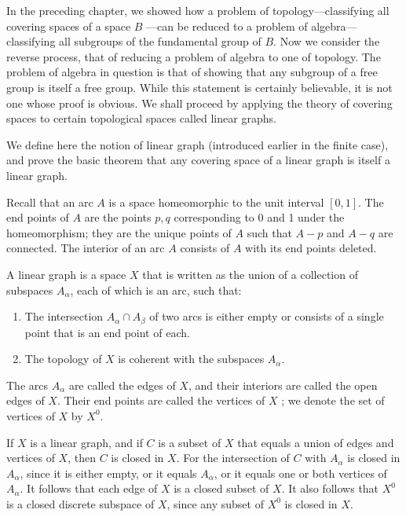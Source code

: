 
In the preceding chapter, we showed how a problem of topology---classifying all covering spaces of a space \(B\) ---can be reduced to a problem of algebra---classifying all subgroups of the fundamental group of \(B\). Now we consider the reverse process, that of reducing a problem of algebra to one of topology. The problem of algebra in question is that of showing that any subgroup of a free group is itself a free group. While this statement is certainly believable, it is not one whose proof is obvious. We shall proceed by applying the theory of covering spaces to certain topological spaces called linear graphs.


We define here the notion of linear graph (introduced earlier in the finite case), and prove the basic theorem that any covering space of a linear graph is itself a linear graph.

Recall that an arc \(A\) is a space homeomorphic to the unit interval \([ {0,1}]\). The end points of \(A\) are the points \(p,q\) corresponding to 0 and 1 under the homeomorphism; they are the unique points of \(A\) such that \(A - p\) and \(A - q\) are connected. The interior of an arc \(A\) consists of \(A\) with its end points deleted.

\begin{definition}
	A linear graph is a space \(X\) that is written as the union of a collection of subspaces \(A_{\alpha }\), each of which is an arc, such that:

	\begin{enumerate}[itemsep=0.2em, parsep=0pt, topsep=0pt, partopsep=0pt, leftmargin=*, label=(\arabic*), align=left]
	\item The intersection \(A_{\alpha } \cap {A}_{\beta }\) of two arcs is either empty or consists of a single point that is an end point of each.
	\item The topology of \(X\) is coherent with the subspaces \(A_{\alpha }\).
	\end{enumerate}

The arcs \(A_{\alpha }\) are called the edges of \(X\), and their interiors are called the open edges of \(X\). Their end points are called the vertices of \(X\) ; we denote the set of vertices of \(X\) by \(X^{0}\).
\end{definition}

If \(X\) is a linear graph, and if \(C\) is a subset of \(X\) that equals a union of edges and vertices of \(X\), then \(C\) is closed in \(X\). For the intersection of \(C\) with \(A_{\alpha }\) is closed in \(A_{\alpha }\), since it is either empty, or it equals \(A_{\alpha }\), or it equals one or both vertices of \(A_{\alpha }\). It follows that each edge of \(X\) is a closed subset of \(X\). It also follows that \(X^{0}\) is a closed discrete subspace of \(X\), since any subset of \(X^{0}\) is closed in \(X\).

